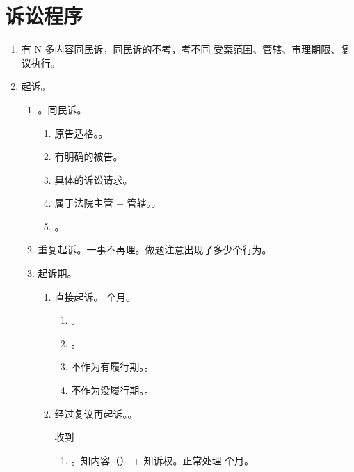 \section{诉讼程序}
\begin{enumerate}
  \item 有 N 多内容同民诉，同民诉的不考，考不同 \yjt 受案范围、管辖、审理期限、复议执行。
  \item 起诉。
        \begin{enumerate}
          \item {}。同民诉。
                \begin{enumerate}
                  \item 原告适格。。
                  \item 有明确的被告。
                  \item 具体的诉讼请求。
                  \item 属于法院主管 + 管辖。。
                  \item {}。
                \end{enumerate}
          \item 重复起诉。一事不再理。做题注意出现了多少个行为。
          \item 起诉期。
                \begin{enumerate}
                  \item 直接起诉。 个月。
                        \begin{enumerate}
                          \item {}。
                          \item {}。
                          \item 不作为有履行期。。
                          \item 不作为没履行期。。
                        \end{enumerate}
                  \item 经过复议再起诉。。
                        \begin{kk}{收到}
                          \begin{enumerate}
                            \item {}。知内容（） + 知诉权。正常处理  个月。

\end{enumerate}
\end{kk}
\end{enumerate}
\end{enumerate}
\end{enumerate}
